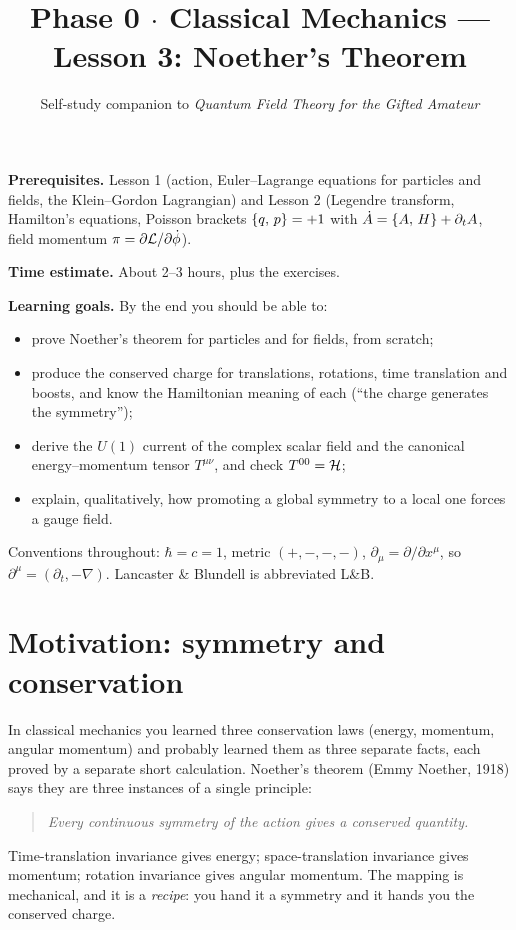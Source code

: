 \documentclass[11pt]{article}
\title{Phase 0 $\cdot$ Classical Mechanics --- Lesson 3: Noether's Theorem}
\author{Self-study companion to \emph{Quantum Field Theory for the Gifted Amateur}}
\date{}
\begin{document}
\maketitle

\begin{tcolorbox}[colback=gray!5,colframe=gray!60!black,title={Lesson overview},breakable]
\textbf{Prerequisites.} Lesson 1 (action, Euler--Lagrange equations for particles and fields, the Klein--Gordon Lagrangian) and Lesson 2 (Legendre transform, Hamilton's equations, Poisson brackets $\left\{q,\,p\right\}=+1$ with $\dot A=\left\{A,\,H\right\}+\partial_t A$, field momentum $\pi=\partial\mathcal{L}/\partial\dot\phi$).

\textbf{Time estimate.} About 2--3 hours, plus the exercises.

\textbf{Learning goals.} By the end you should be able to:
\begin{itemize}[nosep]
  \item prove Noether's theorem for particles and for fields, from scratch;
  \item produce the conserved charge for translations, rotations, time translation and boosts, and know the Hamiltonian meaning of each (``the charge generates the symmetry'');
  \item derive the $U(1)$ current of the complex scalar field and the canonical energy--momentum tensor $T^{\mu\nu}$, and check $T^{00}=\mathcal{H}$;
  \item explain, qualitatively, how promoting a global symmetry to a local one forces a gauge field.
\end{itemize}
Conventions throughout: $\hbar=c=1$, metric $(+,-,-,-)$, $\partial_\mu=\partial/\partial x^\mu$, so $\partial^\mu=(\partial_t,-\nabla)$. Lancaster \& Blundell is abbreviated L\&B.
\end{tcolorbox}

\tableofcontents

\section{Motivation: symmetry and conservation}

In classical mechanics you learned three conservation laws (energy, momentum, angular momentum) and probably learned them as three separate facts, each proved by a separate short calculation. Noether's theorem (Emmy Noether, 1918) says they are three instances of a single principle:
\begin{quote}
\emph{Every continuous symmetry of the action gives a conserved quantity.}
\end{quote}
Time-translation invariance gives energy; space-translation invariance gives momentum; rotation invariance gives angular momentum. The mapping is mechanical, and it is a \emph{recipe}: you hand it a symmetry and it hands you the conserved charge.
\end{document}
